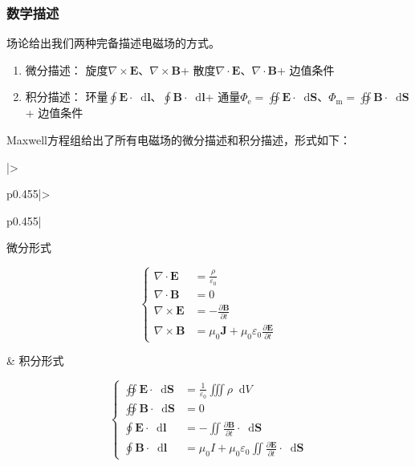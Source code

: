 \documentclass[UTF8,fontset=fandol,zihao=5]{ctexart}
\newcommand{\vect}[1]{\bm{#1}}
\newcommand{\dif}{\mathop{}\!\mathrm{d}}
\begin{document}
\subsubsection{数学描述}

场论给出我们两种完备描述电磁场的方式。

\begin{enumerate}[label=\arabic*.]
  \item 微分描述：
  旋度$\nabla\times\vect{E}$、$\nabla\times\vect{B}$+
  散度$\nabla\cdot\vect{E}$、$\nabla\cdot\vect{B}$+
  边值条件
  
  \item 积分描述：
  环量$\displaystyle \oint \vect E \cdot \dif \vect l$、$\displaystyle \oint \vect B \cdot \dif \vect l$+
  通量$\displaystyle \varPhi_{\mathrm e} = \oiint \vect E \cdot \dif \vect S$、$\displaystyle \varPhi_{\mathrm m} = \oiint \vect B \cdot \dif \vect S$+
  边值条件
  
\end{enumerate}

Maxwell方程组给出了所有电磁场的微分描述和积分描述，形式如下：

\noindent\begin{minipage}{\linewidth}
\centering
\begin{tabular}{|>{\raggedright\arraybackslash}p{}|>{\raggedright\arraybackslash}p{}|}
\hline

\centering 微分形式

\[
\left\{
\begin{aligned}
\nabla\cdot\vect{E} &= \frac{\rho}{\varepsilon_0}\\
\nabla\cdot\vect{B} &= 0\\
\nabla\times\vect{E} &= -\frac{\partial\vect{B}}{\partial t}\\
\nabla\times\vect{B} &= \mu_0\vect{J}
+\mu_0\varepsilon_0\frac{\partial\vect{E}}{\partial t}
\end{aligned}
\right.
\]\par\strut

& \centering\arraybackslash 积分形式

\[
\left\{
\begin{aligned}
\oiint \vect{E}\cdot\dif \vect{S}
&= \frac{1}{\varepsilon_0}\iiint \rho \dif {V}\\
\oiint \vect{B}\cdot\dif \vect{S}
&= 0\\
\oint \vect{E}\cdot\dif \vect{l}
&= -\iint \frac{\partial\vect{B}}{\partial t} \cdot\dif \vect{S}\\
\oint \vect{B}\cdot\dif \vect{l}
&= \mu_0 I+\mu_0\varepsilon_0
\iint \frac{\partial\vect{E}}{\partial t} \cdot\dif \vect{S}
\end{aligned}
\right.
\]\par\strut

\\ \hline

\end{tabular}
\end{minipage}\par
\end{document}
